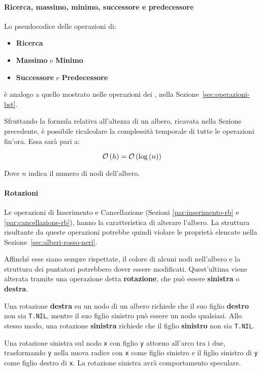 \documentclass[italian, 10pt]{article}
\begin{document}
\paragraph{Ricerca, massimo, minimo, successore e predecessore}
\label{par:operazioni-rb-analoghe-a-bst}

Lo pseudocodice delle operazioni di:

\begin{itemize}
  \item \textbf{Ricerca}
  \item \textbf{Massimo} e \textbf{Minimo}
  \item \textbf{Successore} e \textbf{Predecessore}
\end{itemize}

è analogo a quello mostrato nelle operazioni dei \BST, nella Sezione~\ref{sec:operazioni-bst}.

Sfruttando la formula relativa all'altezza di un albero, ricavata nella Sezione precedente, è possibile ricalcolare la complessità temporale di tutte le operazioni fin'ora.
Essa sarà pari a:

\[ \mathcal{O}\left(h\right) = \mathcal{O}\left(\log{(n)}\right)\]

Dove \(n\) indica il numero di nodi dell'albero.

\paragraph{Rotazioni}
\label{par:rotazioni-rb}

Le operazioni di Inserimento e Cancellazione (Sezioni \ref{par:inserimento-rb} e \ref{par:cancellazione-rb}), hanno la caratteristica di alterare l'albero.
La struttura risultante da queste operazioni potrebbe quindi violare le proprietà elencate nella Sezione~\ref{sec:alberi-rosso-neri}.

Affinché esse siano sempre rispettate, il colore di alcuni nodi nell'albero e la struttura dei puntatori potrebbero dover essere modificati.
Quest'ultima viene alterata tramite una operazione detta \textbf{rotazione}, che può essere \textbf{sinistra} o \textbf{destra}.

Una rotazione \textbf{destra} su un nodo di un albero \RB richiede che il suo figlio \textbf{destro} non sia \texttt{T.NIL}, mentre il suo figlio sinistro può essere un nodo qualsiasi.
Allo stesso modo, una rotazione \textbf{sinistra} richiede che il figlio \textbf{sinistro} non sia \texttt{T.NIL}.

Una rotazione sinistra sul nodo \texttt{x} con figlio \texttt{y}  attorno all'arco tra i due, trasformando \texttt{y} nella nuova radice con \texttt{x} come figlio sinistro e il figlio sinistro di \texttt{y} come figlio destro di \texttt{x}.
La rotazione sinistra avrà comportamento speculare.
\end{document}

